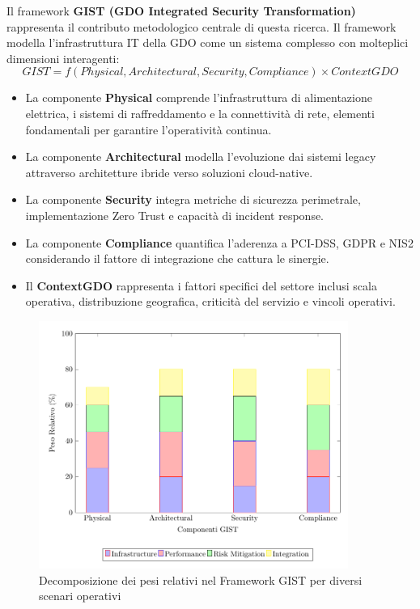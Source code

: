 \documentclass[12pt,a4paper,oneside]{book}
\begin{document}
Il framework \textbf{GIST (GDO Integrated Security Transformation)} rappresenta il contributo metodologico centrale di questa ricerca. 
Il framework modella l'infrastruttura IT della GDO come un sistema complesso con molteplici dimensioni interagenti:
\begin{equation}
   GIST = f(Physical, Architectural, Security, Compliance) × ContextGDO 
\end{equation}

\begin{itemize}
\item 
La componente \textbf{Physical} comprende l'infrastruttura di alimentazione
elettrica, i sistemi di raffreddamento e la connettività di rete,
elementi fondamentali per garantire l'operatività continua.
\item 
La componente \textbf{Architectural} modella l'evoluzione dai sistemi legacy
attraverso architetture ibride verso soluzioni cloud-native.
\item
La componente \textbf{Security} integra metriche di sicurezza perimetrale, implementazione Zero Trust e capacità di incident response.
\item La componente \textbf{Compliance} quantifica l'aderenza a PCI-DSS, GDPR e NIS2 considerando il fattore di integrazione che cattura le sinergie. 
\item 
Il \textbf{ContextGDO} rappresenta i fattori specifici del settore inclusi scala
operativa, distribuzione geografica, criticità del servizio e vincoli
operativi.
\end{itemize}
\begin{figure}[htbp]
    \centering
    \includegraphics[width=0.9\textwidth]{figura 1-3}
    \caption{Decomposizione dei pesi relativi nel Framework GIST per diversi scenari operativi}
    \label{fig:gist_decomposition}
\end{figure}
\end{document}
